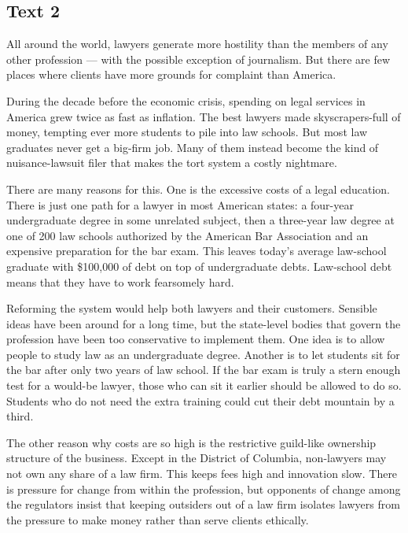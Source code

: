 \documentclass[UTF8,11pt]{ctexart}
\begin{document}
\subsection*{\textbf{Text 2}}


All around the world, lawyers generate more hostility than the members of any other profession — with the possible exception of journalism. But there are few places where clients have more grounds for complaint than America.


During the decade before the economic crisis, spending on legal services in America grew twice as fast as inflation. The best lawyers made skyscrapers-full of money, tempting ever more students to pile into law schools. But most law graduates never get a big-firm job. Many of them instead become the kind of nuisance-lawsuit filer that makes the tort system a costly nightmare.


There are many reasons for this. One is the excessive costs of a legal education. There is just one path for a lawyer in most American states: a four-year undergraduate degree in some unrelated subject, then a three-year law degree at one of 200 law schools authorized by the American Bar Association and an expensive preparation for the bar exam. This leaves today’s average law-school graduate with \$100,000 of debt on top of undergraduate debts. Law-school debt means that they have to work fearsomely hard.


Reforming the system would help both lawyers and their customers. Sensible ideas have been around for a long time, but the state-level bodies that govern the profession have been too conservative to implement them. One idea is to allow people to study law as an undergraduate degree. Another is to let students sit for the bar after only two years of law school. If the bar exam is truly a stern enough test for a would-be lawyer, those who can sit it earlier should be allowed to do so. Students who do not need the extra training could cut their debt mountain by a third.


The other reason why costs are so high is the restrictive guild-like ownership structure of the business. Except in the District of Columbia, non-lawyers may not own any share of a law firm. This keeps fees high and innovation slow. There is pressure for change from within the profession, but opponents of change among the regulators insist that keeping outsiders out of a law firm isolates lawyers from the pressure to make money rather than serve clients ethically.
\end{document}
